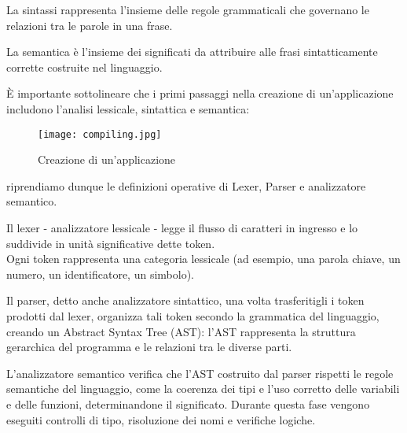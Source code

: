 \documentclass{article}
\begin{document}
\noindent
\begin{definition} \label{def:Sintassi}
La sintassi rappresenta l'insieme delle regole grammaticali che governano le relazioni tra le parole in una frase.\\
\end{definition}

\noindent
\begin{definition} 
La semantica è l'insieme dei significati da attribuire alle frasi sintatticamente  corrette costruite nel linguaggio.
\newline
\end{definition}
\noindent
È importante sottolineare che i primi passaggi nella creazione di un'applicazione includono l'analisi lessicale, sintattica e semantica:
\begin{figure}[H]
    \centering
    \texttt{[image: compiling.jpg]}
    \caption{Creazione di un'applicazione}
    \label{fig:enter-label}
\end{figure}
\noindent
riprendiamo dunque le definizioni operative di Lexer, Parser e analizzatore semantico.\\
\begin{definition} 
Il lexer - analizzatore lessicale - legge il flusso di caratteri in ingresso e lo suddivide in unità significative dette token.
\\Ogni token rappresenta una categoria lessicale (ad esempio, una parola chiave, un numero, un identificatore, un simbolo).
\end{definition}
\begin{definition} 
Il parser, detto anche analizzatore sintattico, una volta trasferitigli i token prodotti dal lexer, organizza tali token secondo la grammatica del linguaggio, creando un Abstract Syntax Tree (AST): l'AST rappresenta la struttura gerarchica del programma e le relazioni tra le diverse parti.
 \end{definition}
 \begin{definition} 
L'analizzatore semantico verifica che l'AST costruito dal parser rispetti le regole semantiche del linguaggio, come la coerenza dei tipi e l'uso corretto delle variabili e delle funzioni, determinandone il significato. Durante questa fase vengono eseguiti controlli di tipo, risoluzione dei nomi e verifiche logiche.
 \end{definition}
 
\end{document}
